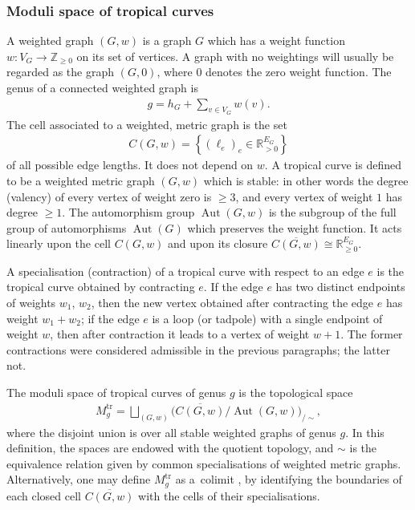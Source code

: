 \documentclass[pdftex]{sigma}%
\numberwithin{equation}{section}
\newcommand{\R}{\mathbb R}
\newcommand{\tr}{\mathrm{tr}}
\newcommand{\0}{\color{blue}{\mathsf{0}}}
\begin{document}
\subsubsection{Moduli space of tropical curves} \label{Sect: ModTrop}
A weighted graph $(G,w)$ is a graph $G$ which has a weight function $w\colon V_G \rightarrow \mathbb{Z}_{\geq 0}$ on its set of vertices. A graph with no weightings will usually be regarded as the graph $(G,0)$, where $0$ denotes the zero weight function.
 The genus of a connected weighted graph is
 \begin{gather*}
 g = h_G + \sum_{v\in V_G} w(v).
 \end{gather*}
The cell associated to a weighted, metric graph is the set
\begin{gather*}
C(G,w) = \left\{ ( \ell_e)_e \in \R_{>0}^{E_G} \right\}
\end{gather*}
of all possible edge lengths. It does not depend on $w$.
A tropical curve \cite{BMV} is defined to be a weighted metric graph $(G,w)$ which is stable: in other words the degree (valency) of every vertex of weight zero is $\geq 3$, and every vertex of weight $1$ has degree $\geq 1$.
 The automorphism group $\operatorname{Aut}(G,w)$ is the subgroup of the full group of automorphisms $\operatorname{Aut}(G)$ which preserves the weight function. It acts linearly upon the cell $C(G,w)$ and upon its closure $\overline{C(G,w)} \cong \R^{E_G}_{\geq 0}$.

 A specialisation (contraction) of a tropical curve with respect to an edge $e$ is the tropical curve obtained by contracting $e$. If the edge $e$ has two distinct endpoints of weights $w_1$, $w_2$, then the new vertex obtained after contracting the edge $e$ has weight $w_1+w_2$; if the edge $e$ is a loop (or tadpole) with a single endpoint of weight $w$, then after contraction it leads to a vertex of weight $w+1$. The former contractions were considered admissible in the previous paragraphs; the latter not.

 The moduli space of tropical curves \cite{BMV} of genus $g$ is the topological space
 \begin{gather*}
 M^{\tr}_g = \bigsqcup_{(G,w)} \big( \overline{C(G,w)}/\operatorname{Aut}(G,w)\big)_{/\sim},
 \end{gather*}
 where the disjoint union is over all stable weighted graphs of genus $g$. In this definition, the spaces are endowed with the quotient topology, and $\sim$ is the equivalence relation given by common specialisations of weighted metric graphs.
 Alternatively, one may define $M^{\tr}_g$ as a~colimit \cite{CGP}, by identifying the boundaries of each closed cell $\overline{C(G,w)}$ with the cells of their specialisations.
\end{document}
